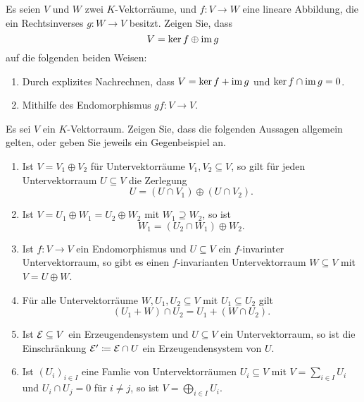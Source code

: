 \documentclass[a4paper,10pt]{scrartcl}
\begin{document}
\begin{question}
  Es seien $V$ und $W$ zwei $K$-Vektorräume, und $f \colon V \to W$ eine lineare Abbildung, die ein Rechtsinverses $g \colon W \to V$ besitzt.
  Zeigen Sie, dass
  \[
    V = \ker f \oplus \operatorname{im} g
  \]
  auf die folgenden beiden Weisen:
  \begin{enumerate}[leftmargin=*]
    \item
      Durch explizites Nachrechnen, dass $V = \ker f + \operatorname{im} g$ und $\ker f \cap \operatorname{im} g = 0$.
    \item
      Mithilfe des Endomorphismus $gf \colon V \to V$.
  \end{enumerate}
\end{question}


\begin{question}
  Es sei $V$ ein $K$-Vektorraum.
  Zeigen Sie, dass die folgenden Aussagen allgemein gelten, oder geben Sie jeweils ein Gegenbeispiel an.
  \begin{enumerate}[leftmargin=*]
    \item
      Ist $V = V_1 \oplus V_2$ für Untervektorräume $V_1, V_2 \subseteq V$, so gilt für jeden Untervektorraum $U \subseteq V$ die Zerlegung
      \[
        U = (U \cap V_1) \oplus (U \cap V_2).
      \]
    \item
      Ist $V = U_1 \oplus W_1 = U_2 \oplus W_2$ mit $W_1 \supseteq W_2$, so ist
      \[
        W_1 = (U_2 \cap W_1) \oplus W_2.
      \]
    \item
      Ist $f \colon V \to V$ ein Endomorphismus und $U \subseteq V$ ein $f$-invarinter Untervektorraum, so gibt es einen $f$-invarianten Untervektorraum $W \subseteq V$ mit $V = U \oplus W$.
    \item
      Für alle Untervektorräume $W, U_1, U_2 \subseteq V$ mit $U_1 \subseteq U_2$ gilt
      \[
        (U_1 + W) \cap U_2 =  U_1 + (W \cap U_2).
      \]
    \item
      Ist $\mathcal{E} \subseteq V$ ein Erzeugendensystem und $U \subseteq V$ ein Untervektorraum, so ist die Einschränkung $\mathcal{E}' \coloneqq \mathcal{E} \cap U$ ein Erzeugendensystem von $U$.
    \item
      Ist $(U_i)_{i \in I}$ eine Famlie von Untervektorräumen $U_i \subseteq V$ mit $V = \sum_{i \in I} U_i$ und $U_i \cap U_j = 0$ für $i \neq j$, so ist $V = \bigoplus_{i \in I} U_i$.
  \end{enumerate}
\end{question}
\end{document}
